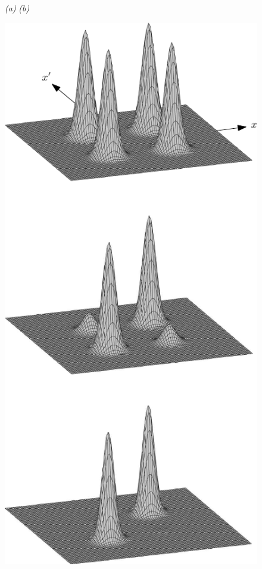 \documentclass[3p,sort&compress]{elsarticle}
\begin{document}
\begin{figure}
{\footnotesize \hspace{1.1cm} \emph{(a)} \hspace{6.9cm} \emph{(b)}}

\centering
\includegraphics[scale=.77]{r1.pdf} \hspace{1.5cm}

\end{figure}
\end{document}
